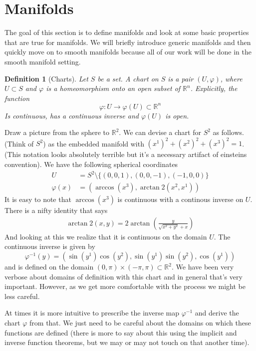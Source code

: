 \documentclass[a4paper]{article}
\newtheorem*{defn}{Definition}
\begin{document}
\section*{Manifolds}%
The goal of this section is to define manifolds and look at some basic properties that are true for manifolds. We will briefly introduce generic manifolds and then quickly move on to smooth manifolds because all of our work will be done in the smooth manifold setting.

\begin{defn}[Charts]
  Let $S$ be a set.  A chart on $S$ is a pair $(U, \varphi)$, where $U \subset S$ and $\varphi$ is a homeomorphism onto an open subset of $\mathds{R}^n$. Explicitly, the function
  \[
    \varphi: U \rightarrow \varphi(U) \subset \mathds{R}^n
  \]
  Is continuous, has a continuous inverse and $\varphi(U)$ is open.
\end{defn}

Draw a picture from the sphere to $\mathds{R}^2$. We can devise a chart for $S^2$ as follows. (Think of $S^2$) as the embedded manifold with $(x^1)^2 + (x^2)^2 + (x^3)^2 = 1$. (This notation looks absolutely terrible but it's a necessary artifact of einsteins convention). We have the following spherical coordinates
\[
  \begin{aligned}
    U &= S^2 \setminus \{(0,0,1), (0,0,-1), (-1,0,0)\} \\
    \varphi(x) &= (\arccos(x^3), \arctan2(x^2,x^1))
  \end{aligned}
\]
It is easy to note that $\arccos(x^3)$ is continuous with a continous inverse on $U$. There is a nifty identity that says
\[
  \begin{aligned}
    \arctan2(x,y) = 2 \arctan \left( \frac{y}{\sqrt{x^2 + y^2} + x}\right)
  \end{aligned}
\]
And looking at this we realize that it is continuous on the domain $U$. The continuous inverse is given by
\[
  \varphi^{-1}(y) = (\sin(y^1)\cos(y^2), \sin(y^1)\sin(y^2), \cos(y^1))
\]
and is defined on the domain $(0,\pi) \times (-\pi, \pi) \subset \mathds{R}^2$. We have been very verbose about domains of definition with this chart and in general that's very important. However, as we get more comfortable with the process we might be less careful. 

At times it is more intuitive to prescribe the inverse map $\varphi^{-1}$ and derive the chart $\varphi$ from that. We just need to be careful about the domains on which these functions are defined (there is more to say about this using the implicit and inverse function theorems, but we may or may not touch on that another time).
\end{document}
